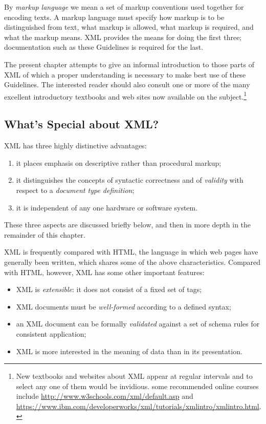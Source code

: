 By \textit{markup language} we mean a set of markup conventions used together for encoding texts. A markup language must specify how markup is to be distinguished from text, what markup is allowed, what markup is required, and what the markup means. XML provides the means for doing the first three; documentation such as these Guidelines is required for the last.\par
The present chapter attempts to give an informal introduction to those parts of XML of which a proper understanding is necessary to make best use of these Guidelines. The interested reader should also consult one or more of the many excellent introductory textbooks and web sites now available on the subject.\footnote{New textbooks and websites about XML appear at regular intervals and to select any one of them would be invidious.  some recommended online courses include \url{http://www.w3schools.com/xml/default.asp} and \url{https://www.ibm.com/developerworks/xml/tutorials/xmlintro/xmlintro.html}.}
\subsection[{What's Special about XML?}]{What's Special about XML?}\label{SG11}\par
XML has three highly distinctive advantages: \begin{enumerate}
\item it places emphasis on descriptive rather than procedural markup;
\item it distinguishes the concepts of syntactic correctness and of \textit{validity} with respect to a \textit{document type definition};
\item it is independent of any one hardware or software system.
\end{enumerate} These three aspects are discussed briefly below, and then in more depth in the remainder of this chapter.\par
XML is frequently compared with HTML, the language in which web pages have generally been written, which shares some of the above characteristics. Compared with HTML, however, XML has some other important features: \begin{itemize}
\item XML is {\itshape extensible}: it does not consist of a fixed set of tags;
\item XML documents must be {\itshape well-formed} according to a defined syntax;
\item an XML document can be formally {\itshape validated} against a set of schema rules for consistent application;
\item XML is more interested in the meaning of data than in its presentation.
\end{itemize} 
